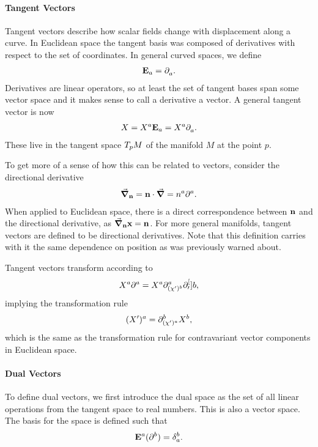 \paragraph{Tangent Vectors}
Tangent vectors describe how scalar fields change with displacement along a curve. In Euclidean space the tangent basis was composed of derivatives with respect to the set of coordinates. In general curved spaces, we define
\begin{align*}
	\vb{E}_{a} = \partial^{}_{a}.
\end{align*}
Derivatives are linear operators, so at least the set of tangent bases span some vector space and it makes sense to call a derivative a vector. A general tangent vector is now
\begin{align*}
	X = X^{a}\vb{E}_{a} = X^{a}\partial^{}_{a}.
\end{align*}
These live in the tangent space $T_{p}M$ of the manifold $M$ at the point $p$.

To get more of a sense of how this can be related to vectors, consider the directional derivative
\begin{align*}
\grad_{\vb{n}} = \vb{n}\cdot\grad = n^{a}\partial^{a}_{}.
\end{align*}
When applied to Euclidean space, there is a direct correspondence between $\vb{n}$ and the directional derivative, as $\grad_{\vb{n}}{\vb{x}} = \vb{n}$. For more general manifolds, tangent vectors are defined to be directional derivatives. Note that this definition carries with it the same dependence on position as was previously warned about.

Tangent vectors transform according to
\begin{align*}
X^{a}\partial^{a}_{} = X^{a}\partial^{a}_{(\chi^{\prime})^{b}}\partial^{[}_{\prime}]{b}{},
\end{align*}
implying the transformation rule
\begin{align*}
(X^{\prime})^{a} = \partial^{b}_{(\chi^{\prime})^{a}}X^{b},
\end{align*}
which is the same as the transformation rule for contravariant vector components in Euclidean space.

\paragraph{Dual Vectors}
To define dual vectors, we first introduce the dual space as the set of all linear operations from the tangent space to real numbers. This is also a vector space. The basis for the space is defined such that
\begin{align*}
\db{a}(\del{b}{}) = \kdelta{b}{a}.
\end{align*}


